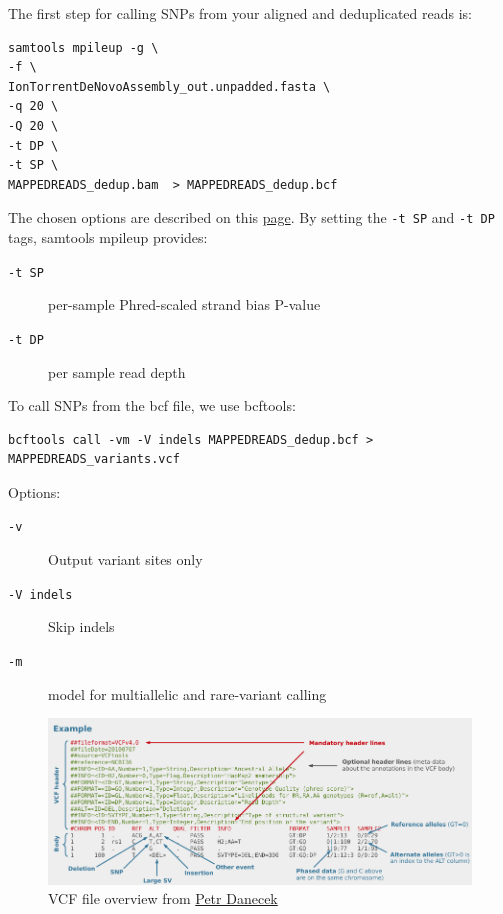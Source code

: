 \documentclass[11pt]{article}
\begin{document}
The first step for calling SNPs from your aligned and deduplicated
reads is:

\begin{verbatim}
samtools mpileup -g \
-f \
IonTorrentDeNovoAssembly_out.unpadded.fasta \
-q 20 \
-Q 20 \
-t DP \
-t SP \
MAPPEDREADS_dedup.bam  > MAPPEDREADS_dedup.bcf
\end{verbatim}

The chosen options are described on this \href{http://samtools.sourceforge.net/samtools.shtml}{page}. By setting the \texttt{-t SP} and
\texttt{-t DP} tags, samtools mpileup provides:

\begin{description}
\item[{\texttt{-t SP}}] per-sample Phred-scaled strand bias P-value
\item[{\texttt{-t DP}}] per sample read depth
\end{description}


To call SNPs from the bcf file, we use bcftools:

\begin{verbatim}
bcftools call -vm -V indels MAPPEDREADS_dedup.bcf >  MAPPEDREADS_variants.vcf
\end{verbatim}


Options:
\begin{description}
\item[{\texttt{-v}}] Output variant sites only
\item[{\texttt{-V indels}}] Skip indels
\item[{\texttt{-m}}] model for multiallelic and rare-variant calling
\end{description}


\begin{figure}[htb]
\centering
\includegraphics[width=17cm]{DanecekVcfFile.png}
\caption{\label{fig:orgparagraph3}
VCF file overview from \href{http://vcftools.sourceforge.net/VCF-poster.pdf}{Petr Danecek}}
\end{figure}
\end{document}
